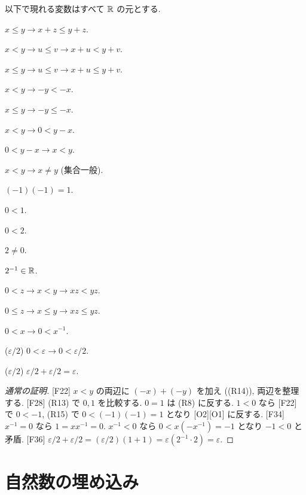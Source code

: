 \begin{lem}\label{lem:order}
  以下で現れる変数はすべて $\mathbb{R}$ の元とする.
  \begin{enumerate}[label={[F\arabic*]}, start=19]
    \item $x \leq y \to x + z \leq y + z$.
    \item $x < y \to u \leq v \to x + u < y + v$.
    \item $x \leq y \to u \leq v \to x + u \leq y + v$.
    \item $x < y \to -y < -x$.
    \item $x \leq y \to -y \leq -x$.
    \item $x < y \to 0 < y - x$.
    \item $0 < y - x \to x < y$.
    \item $x < y \to x \neq y$ (集合一般).
    \item $(-1)(-1) = 1$.
    \item $0 < 1$.
    \item $0 < 2$.
    \item $2 \neq 0$.
    \item $2^{-1} \in \mathbb{R}$.
    \item $0 < z \to x < y \to x z < y z$.
    \item $0 \leq z \to x \leq y \to x z \leq y z$.
    \item $0 < x \to 0 < x^{-1}$.
    \item ($\varepsilon/2$) $0 < \varepsilon \to 0 < \varepsilon/2$.
    \item ($\varepsilon/2$) $\varepsilon/2 + \varepsilon/2 = \varepsilon$.
  \end{enumerate}
\end{lem}
\begin{proof}[通常の証明]
  [F22] $x < y$ の両辺に $(-x) + (-y)$ を加え ((R14)), 両辺を整理する. [F28] (R13) で $0, 1$ を比較する. $0 = 1$ は (R8) に反する. $1 < 0$ なら [F22] で $0 < -1$, (R15) で $0 < (-1)(-1) = 1$ となり [O2][O1] に反する. [F34] $x^{-1} = 0$ なら $1 = x x^{-1} = 0$. $x^{-1} < 0$ なら $0 < x(-x^{-1}) = -1$ となり $-1 < 0$ と矛盾. [F36] $\varepsilon/2 + \varepsilon/2 = (\varepsilon/2)(1 + 1) = \varepsilon(2^{-1} \cdot 2) = \varepsilon$.
\end{proof}

\section{自然数の埋め込み}

